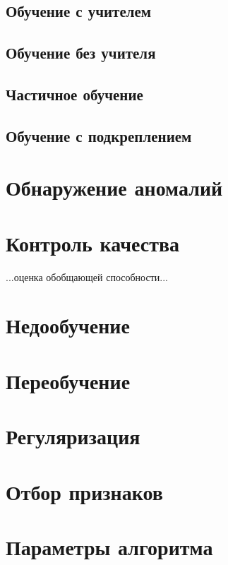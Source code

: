 \subsection{Обучение с учителем}

\subsection{Обучение без учителя}

\subsection{Частичное обучение}

\subsection{Обучение с подкреплением}


\section{Обнаружение аномалий}


\section{Контроль качества}

...оценка обобщающей способности...


\section{Недообучение}


\section{Переобучение}


\section{Регуляризация}


\section{Отбор признаков}


\section{Параметры алгоритма}



